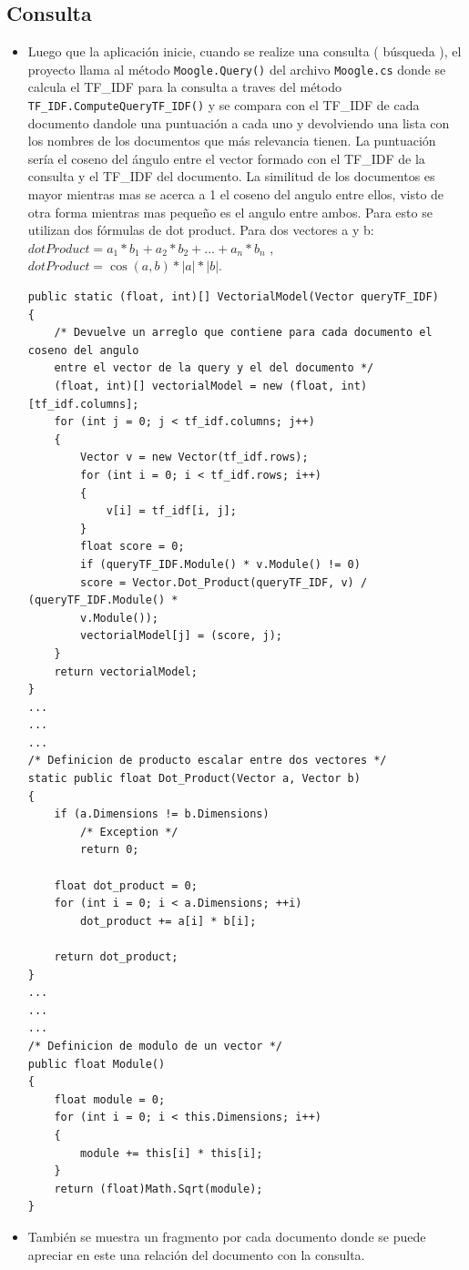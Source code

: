 \documentclass[12pt, a4paper]{article}
\begin{document}
\subsection*{Consulta}

\begin{itemize}
    \item Luego que la aplicación inicie, cuando se realize una consulta ( búsqueda ), el proyecto llama al método
    \texttt{Moogle.Query()} del archivo \texttt{Moogle.cs} donde se calcula el TF\_IDF para la consulta a traves del
    método \texttt{TF\_IDF.ComputeQueryTF\_IDF()} y se compara con el TF\_IDF de cada documento dandole
    una puntuación a cada uno y devolviendo una lista con los nombres de los documentos que más
    relevancia tienen. La puntuación sería el coseno del ángulo entre el vector formado con el TF\_IDF de la
    consulta y el TF\_IDF del documento. La similitud de los documentos es mayor mientras mas
    se acerca a 1 el coseno del angulo entre ellos, visto de otra forma mientras mas pequeño es el angulo
    entre ambos. Para esto se utilizan dos fórmulas de dot product. Para dos vectores a y b: $dotProduct
    = a_1 * b_1 + a_2 * b_2 + ... + a_n* b_n$ , $dotProduct = \cos(a,b) * |a|*|b|$.

\begin{lstlisting}
public static (float, int)[] VectorialModel(Vector queryTF_IDF)
{
    /* Devuelve un arreglo que contiene para cada documento el coseno del angulo
    entre el vector de la query y el del documento */
    (float, int)[] vectorialModel = new (float, int)[tf_idf.columns];
    for (int j = 0; j < tf_idf.columns; j++)
    {
        Vector v = new Vector(tf_idf.rows);
        for (int i = 0; i < tf_idf.rows; i++)
        {
            v[i] = tf_idf[i, j];
        }
        float score = 0;
        if (queryTF_IDF.Module() * v.Module() != 0)
        score = Vector.Dot_Product(queryTF_IDF, v) / (queryTF_IDF.Module() *
        v.Module());
        vectorialModel[j] = (score, j);
    }
    return vectorialModel;
}
...
...
...
/* Definicion de producto escalar entre dos vectores */
static public float Dot_Product(Vector a, Vector b)
{
    if (a.Dimensions != b.Dimensions)
        /* Exception */
        return 0;
    
    float dot_product = 0;
    for (int i = 0; i < a.Dimensions; ++i)
        dot_product += a[i] * b[i];
    
    return dot_product;
}
...
...
...
/* Definicion de modulo de un vector */
public float Module()
{
    float module = 0;
    for (int i = 0; i < this.Dimensions; i++)
    {
        module += this[i] * this[i];
    }
    return (float)Math.Sqrt(module);
}
\end{lstlisting}

\item También se muestra un fragmento por cada documento donde se puede apreciar en este una relación
del documento con la consulta.

\end{itemize}
\end{document}
